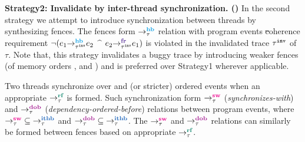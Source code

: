 \noindent
{\bf Strategy2: Invalidate by inter-thread synchronization.
(\wfence)}\newline
In the second strategy we attempt to introduce synchronization
between threads by synthesizing fences. The fences form
$\setHB$ relation with program events \st coherence
requirement
$\neg(\hb{\inv{\tau}}{e_1}{e_2}$ $\^$ $\fr{\inv{\tau}}{e_2}{e_1})$ is
violated in the invalidated trace ${\tau}^{\mathtt{inv}}$ of $\tau$.
%
Note that, this strategy invalidates a buggy trace by introducing 
weaker fences (of memory orders \rel, \acq and \acqrel) and 
is preferred over Strategy1 wherever applicable.

Two threads synchronize over \rel and \acq (or stricter) ordered
events when an appropriate $\setRF$ is formed. Such synchronization
form $\setSW$ ({\it synchronizes-with}) and $\setDOB$ 
({\it dependency-ordered-before}) relations between program events,
\cite{batty2011mathematizing}\cite{C11}
where $\setSW \subseteq \setITHB$ and $\setDOB \subseteq \setITHB$.
%
The $\setSW$ and $\setDOB$ relations can similarly be formed between
fences based on appropriate $\setRF$.



